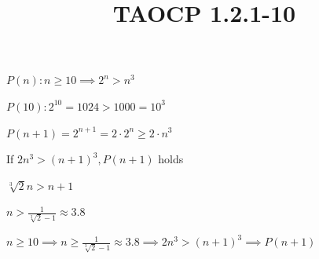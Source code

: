 \documentclass{article}
\title{TAOCP 1.2.1\mbox{-}10}
\begin{document}
\maketitle

\( P(n): n \geq 10 \implies 2^{n} > n^{3} \)

\( P(10): 2^{10}=1024 > 1000 = 10^{3} \)

\( P(n+1) = 2^{n+1} = 2\cdot2^{n} \geq 2 \cdot n^{3} \)

If \( 2n^{3} > {(n+1)}^{3}, P(n+1) \) holds

\( \sqrt[3]{2} n > n + 1 \)

\( n > \frac{1}{\sqrt[3]{2} - 1} \approx 3.8 \)

\( n \geq 10 \implies n \geq \frac{1}{\sqrt[3]{2} - 1} \approx 3.8 \implies 2n^{3} > {(n+1)}^{3} \implies P(n+1) \)
\end{document}
